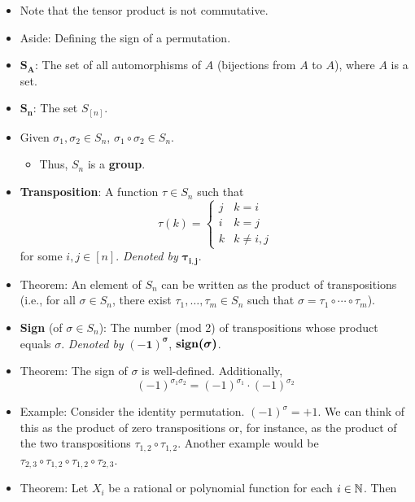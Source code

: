 \documentclass[../notes.tex]{subfiles}
\begin{document}
\begin{itemize}
    \item Note that the tensor product is not commutative.
    \item Aside: Defining the sign of a permutation.
    \item $\bm{S_A}$: The set of all automorphisms of $A$ (bijections from $A$ to $A$), where $A$ is a set.
    \item $\bm{S_n}$: The set $S_{[n]}$.
    \item Given $\sigma_1,\sigma_2\in S_n$, $\sigma_1\circ\sigma_2\in S_n$.
    \begin{itemize}
        \item Thus, $S_n$ is a \textbf{group}.
    \end{itemize}
    \item \textbf{Transposition}: A function $\tau\in S_n$ such that
    \begin{equation*}
        \tau(k) =
        \begin{cases}
            j & k=i\\
            i & k=j\\
            k & k\neq i,j
        \end{cases}
    \end{equation*}
    for some $i,j\in[n]$. \emph{Denoted by} $\bm{\tau_{i,j}}$.
    \item Theorem: An element of $S_n$ can be written as the product of transpositions (i.e., for all $\sigma\in S_n$, there exist $\tau_1,\dots,\tau_m\in S_n$ such that $\sigma=\tau_1\circ\cdots\circ\tau_m$).
    \item \textbf{Sign} (of $\sigma\in S_n$): The number (mod 2) of transpositions whose product equals $\sigma$. \emph{Denoted by} $\bm{(-1)^\sigma}$, $\bm{\sgn(\sigma)}$.
    \item Theorem: The sign of $\sigma$ is well-defined. Additionally,
    \begin{equation*}
        (-1)^{\sigma_1\sigma_2} = (-1)^{\sigma_1}\cdot(-1)^{\sigma_2}
    \end{equation*}
    \item Example: Consider the identity permutation. $(-1)^\sigma=+1$. We can think of this as the product of zero transpositions or, for instance, as the product of the two transpositions $\tau_{1,2}\circ\tau_{1,2}$. Another example would be $\tau_{2,3}\circ\tau_{1,2}\circ\tau_{1,2}\circ\tau_{2,3}$.
    \item Theorem: Let $X_i$ be a rational or polynomial function for each $i\in\mathbb{N}$. Then
    \begin{equation*}

\end{equation*}
\end{itemize}
\end{document}
